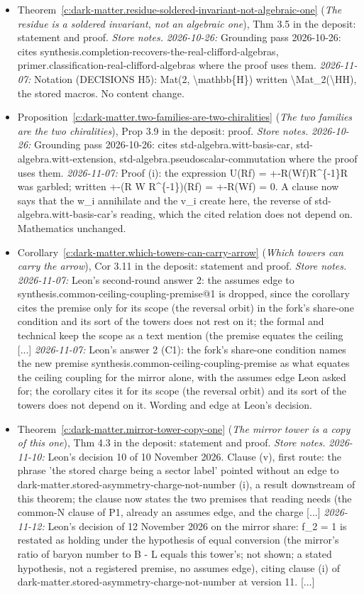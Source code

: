 \documentclass[11pt]{article}
\theoremstyle{definition}
\theoremstyle{plain}
\begin{document}
\begin{itemize}
\item Theorem~\ref{c:dark-matter.residue-soldered-invariant-not-algebraic-one} (\emph{The residue is a soldered invariant, not an algebraic one}), Thm 3.5 in the deposit: statement and proof. \emph{Store notes.} \emph{2026-10-26:} Grounding pass 2026-10-26: cites synthesis.completion-recovers-the-real-clifford-algebras, primer.classification-real-clifford-algebras where the proof uses them. \emph{2026-11-07:} Notation (DECISIONS H5): Mat(2, \textbackslash{}mathbb\{H\}) written \textbackslash{}Mat\_2(\textbackslash{}HH), the stored macros. No content change.
\item Proposition~\ref{c:dark-matter.two-families-are-two-chiralities} (\emph{The two families are the two chiralities}), Prop 3.9 in the deposit: proof. \emph{Store notes.} \emph{2026-10-26:} Grounding pass 2026-10-26: cites std-algebra.witt-basis-car, std-algebra.witt-extension, std-algebra.pseudoscalar-commutation where the proof uses them. \emph{2026-11-07:} Proof (i): the expression U(Rf) = +-R(Wf)R\^{}\{-1\}R was garbled; written +-(R W R\^{}\{-1\})(Rf) = +-R(Wf) = 0. A clause now says that the w\_i annihilate and the v\_i create here, the reverse of std-algebra.witt-basis-car's reading, which the cited relation does not depend on. Mathematics unchanged.
\item Corollary~\ref{c:dark-matter.which-towers-can-carry-arrow} (\emph{Which towers can carry the arrow}), Cor 3.11 in the deposit: statement and proof. \emph{Store notes.} \emph{2026-11-07:} Leon's second-round answer 2: the assumes edge to synthesis.common-ceiling-coupling-premise@1 is dropped, since the corollary cites the premise only for its scope (the reversal orbit) in the fork's share-one condition and its sort of the towers does not rest on it; the formal and technical keep the scope as a text mention (the premise equates the ceiling [...] \emph{2026-11-07:} Leon's answer 2 (C1): the fork's share-one condition names the new premise synthesis.common-ceiling-coupling-premise as what equates the ceiling coupling for the mirror alone, with the assumes edge Leon asked for; the corollary cites it for its scope (the reversal orbit) and its sort of the towers does not depend on it. Wording and edge at Leon's decision.
\item Theorem~\ref{c:dark-matter.mirror-tower-copy-one} (\emph{The mirror tower is a copy of this one}), Thm 4.3 in the deposit: statement and proof. \emph{Store notes.} \emph{2026-11-10:} Leon's decision 10 of 10 November 2026. Clause (v), first route: the phrase 'the stored charge being a sector label' pointed without an edge to dark-matter.stored-asymmetry-charge-not-number (i), a result downstream of this theorem; the clause now states the two premises that reading needs (the common-N clause of P1, already an assumes edge, and the charge [...] \emph{2026-11-12:} Leon's decision of 12 November 2026 on the mirror share: f\_2 = 1 is restated as holding under the hypothesis of equal conversion (the mirror's ratio of baryon number to B - L equals this tower's; not shown; a stated hypothesis, not a registered premise, no assumes edge), citing clause (i) of dark-matter.stored-asymmetry-charge-not-number at version 11. [...]

\end{itemize}
\end{document}

